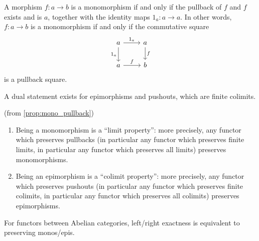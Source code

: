 \begin{lemma}\label{prop:mono_pullback}
A morphism $f : a \rightarrow b$ is a monomorphism if and only if
the pullback of $f$ and $f$ exists and is $a$, together with the identity maps $1_{a} : a \rightarrow a$.
In other words, $f : a \rightarrow b$ is a monomorphism if and only if the commutative square
\[
\begin{tikzcd}
a \arrow[r, "1_{a}"] \arrow[d, "1_{a}"'] & a \arrow[d, "f"] \\
a \arrow[r, "f"]                         & b               
\end{tikzcd}
\]
is a pullback square.

A dual statement exists for epimorphisms and pushouts, which are finite colimits.
\end{lemma}

\begin{corollary}{(from \ref{prop:mono_pullback})}\label{cor:preserve_mono_epi}

\begin{enumerate}
\item Being a monomorphism is a “limit property”: more precisely, any functor which preserves pullbacks
(in particular any functor which preserves finite limits, in particular any functor which preserves all limits)
preserves monomorphisms.
\item Being an epimorphism is a “colimit property”: more precisely, any functor which preserves pushouts
(in particular any functor which preserves finite colimits, in particular any functor which preserves all colimits)
preserves epimorphisms.
\end{enumerate}
\end{corollary}

\begin{lemma}
For functors between Abelian categories, left/right exactness is equivalent to preserving monos/epis.
\end{lemma}

